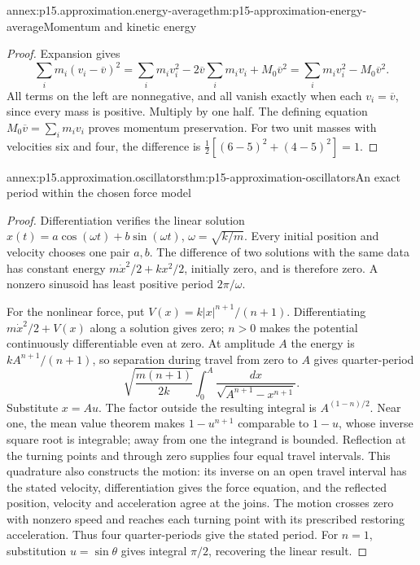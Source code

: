 \begin{annexitem}{annex:p15.approximation.energy-average}{thm:p15-approximation-energy-average}{Momentum and kinetic energy}
\begin{proof}
Expansion gives
\[
 \sum_i m_i(v_i-\overline v)^2
 =\sum_i m_iv_i^2-2\overline v\sum_i m_iv_i+M_0\overline v^2
 =\sum_i m_iv_i^2-M_0\overline v^2.
\]
All terms on the left are nonnegative, and all vanish exactly when each
\(v_i=\overline v\), since every mass is positive. Multiply by one
half. The defining equation \(M_0\overline v=\sum_i m_iv_i\) proves
momentum preservation. For two unit masses with velocities six and four,
the difference is \(\tfrac12[(6-5)^2+(4-5)^2]=1\).
\end{proof}
\end{annexitem}

\begin{annexitem}{annex:p15.approximation.oscillators}{thm:p15-approximation-oscillators}{An exact period within the chosen force model}
\begin{proof}
Differentiation verifies the linear solution
\(x(t)=a\cos(\omega t)+b\sin(\omega t)\), \(\omega=\sqrt{k/m}\).
Every initial position and velocity chooses one pair \(a,b\). The
difference of two solutions with the same data has constant energy
\(m\dot x^2/2+kx^2/2\), initially zero, and is therefore zero.
A nonzero sinusoid has least positive period \(2\pi/\omega\).

For the nonlinear force, put \(V(x)=k|x|^{n+1}/(n+1)\).
Differentiating \(m\dot x^2/2+V(x)\) along a solution gives zero;
\(n>0\) makes the potential continuously differentiable even at zero.
At amplitude \(A\) the energy is \(kA^{n+1}/(n+1)\), so separation
during travel from zero to \(A\) gives quarter-period
\[
 \sqrt{\frac{m(n+1)}{2k}}\int_0^A
       \frac{dx}{\sqrt{A^{n+1}-x^{n+1}}}.
\]
Substitute \(x=Au\). The factor outside the resulting integral is
\(A^{(1-n)/2}\). Near one, the mean value theorem makes
\(1-u^{n+1}\) comparable to \(1-u\), whose inverse square root is
integrable; away from one the integrand is bounded. Reflection at the
turning points and through zero supplies four equal travel intervals.
This quadrature also constructs the motion: its inverse on an open travel
interval has the stated velocity, differentiation gives the force equation,
and the reflected position, velocity and acceleration agree at the joins.
The motion crosses zero with nonzero speed and reaches each turning point
with its prescribed restoring acceleration. Thus four quarter-periods
give the stated period. For \(n=1\), substitution \(u=\sin\theta\)
gives integral \(\pi/2\), recovering the linear result.
\end{proof}
\end{annexitem}


